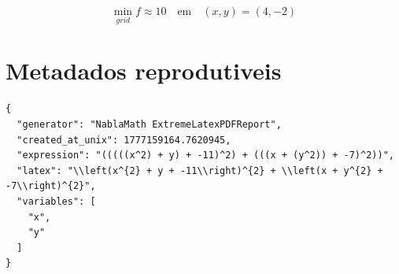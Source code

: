 \documentclass[11pt,a4paper]{article}
\begin{document}
\[
\min_{grid} f \approx 10\quad \text{em}\quad (x,y)=(4,-2)
\]


\section{Metadados reprodutiveis}
\begin{verbatim}
{
  "generator": "NablaMath ExtremeLatexPDFReport",
  "created_at_unix": 1777159164.7620945,
  "expression": "(((((x^2) + y) + -11)^2) + (((x + (y^2)) + -7)^2))",
  "latex": "\\left(x^{2} + y + -11\\right)^{2} + \\left(x + y^{2} + -7\\right)^{2}",
  "variables": [
    "x",
    "y"
  ]
}
\end{verbatim}
\end{document}
